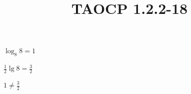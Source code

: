 \documentclass{article}
\title{TAOCP 1.2.2\mbox{-}18}
\begin{document}
\maketitle

\( \log_8{8} = 1 \)

\( \frac{1}{2}\lg{8} = \frac{3}{2} \)

\( 1 \neq \frac{3}{2} \)
\end{document}
